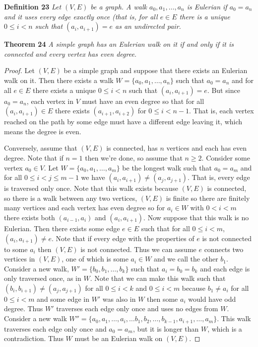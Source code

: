 \documentclass{article}
\begin{document}
\begin{flushleft}
\textbf{Definition 23}
\textsl{Let $(V,E)$ be a graph. A walk $a_0, a_1, \dots , a_n$ is Eulerian if $a_0 = a_n$ and it uses every edge exactly once (that is, for all $e \in E$ there is a unique $0 \leq i < n$ such that $(a_i,a_{i+1}) = e$ as an undirected pair.}\newline

\textbf{Theorem 24}
\textsl{A simple graph has an Eulerian walk on it if and only if it is connected and every vertex has even degree.}
\begin{proof}
Let $(V,E)$ be a simple graph and suppose that there exists an Eulerian walk on it. Then there exists a walk $W = \{a_0, a_1, \dots , a_n\}$ such that $a_0 = a_n$ and for all $e \in E$ there exists a unique $0 \leq i < n$ such that $(a_i, a_{i+1}) = e$. But since $a_0 = a_n$, each vertex in $V$ must have an even degree so that for all $(a_i, a_{i+1}) \in E$ there exists $(a_{i+1}, a_{i+2})$ for $0 \leq i < n-1$. That is, each vertex reached on the path by some edge must have a different edge leaving it, which means the degree is even.\newline

Conversely, assume that $(V,E)$ is connected, has $n$ vertices and each has even degree. Note that if $n=1$ then we're done, so assume that $n \geq 2$. Consider some vertex $a_0 \in V$. Let $W = \{a_0, a_1, \dots , a_m\}$ be the longest walk such that $a_0 = a_m$ and for all $0 \leq i < j \leq m-1$ we have $(a_i, a_{i+1}) \neq (a_j, a_{j+1})$. That is, every edge is traversed only once. Note that this walk exists because $(V,E)$ is connected, so there is a walk between any two vertices, $(V,E)$ is finite so there are finitely many vertices and each vertex has even degree so for $a_i \in W$ with $0 < i < m$ there exists both $(a_{i-1}, a_i)$ and $(a_i, a_{i+1})$. Now suppose that this walk is no Eulerian. Then there exists some edge $e \in E$ such that for all $0 \leq i < m$, $(a_i, a_{i+1}) \neq e$. Note that if every edge with the properties of $e$ is not connected to some $a_i$ then $(V,E)$ is not connected. Thus we can assume $e$ connects two vertices in $(V,E)$, one of which is some $a_i \in W$ and we call the other $b_1$. Consider a new walk, $W' = \{b_0, b_1, \dots, b_k\}$ such that $a_i = b_0 = b_k$ and each edge is only traversed once, as in $W$. Note that we can make this walk such that $(b_i, b_{i+1}) \neq (a_j, a_{j+1})$ for all $0 \leq i < k$ and $0 \leq i < m$ because $b_1 \neq a_i$ for all $0 \leq i < m$ and some edge in $W'$ was also in $W$ then some $a_i$ would have odd degree. Thus $W'$ traverses each edge only once and uses no edges from $W$. Consider a new walk $W'' = \{a_0, a_1, \dots , a_i, \dots b_1, b_2, \dots , b_{k-1}, a_{i+1}, \dots , a_m\}$. This walk traverses each edge only once and $a_0 = a_m$, but it is longer than $W$, which is a contradiction. Thus $W$ must be an Eulerian walk on $(V,E)$.
\end{proof}

\end{flushleft}
\end{document}
